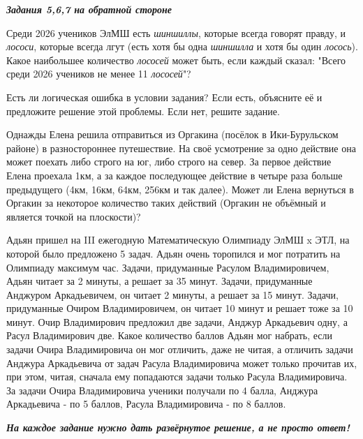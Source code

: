 \centerline{\textbf{\textit{Задания 5,6,7 на обратной стороне}}}

\newpage
\hspace{3mm}

 Среди 2026 учеников ЭлМШ есть \textit{шиншиллы}, которые всегда говорят правду, и \textit{лососи}, которые всегда лгут (есть хотя бы одна \textit{шиншилла} и хотя бы один \textit{лосось}). Какое наибольшее количество \textit{лососей} может быть, если каждый сказал: "Всего среди 2026 учеников не менее 11 \textit{лососей}"?

Есть ли логическая ошибка в условии задания? Если есть, объясните её и предложите решение этой проблемы. Если нет, решите задание.

\hspace{3mm}

 Однажды Елена решила отправиться из Оргакина (посёлок в Ики-Бурульском районе) в разностороннее путешествие. На своё усмотрение за одно действие она может поехать либо строго на юг, либо строго на север. За первое действие Елена проехала 1км, а за каждое последующее действие в четыре раза больше предыдущего (4км, 16км, 64км, 256км и так далее). Может ли Елена вернуться в Оргакин за некоторое количество таких действий (Оргакин не объёмный и является точкой на плоскости)?

\hspace{3mm}

 Адьян пришел на III ежегодную Математическую Олимпиаду ЭлМШ x ЭТЛ, на которой было предложено 5 задач. Адьян очень торопился и мог потратить на Олимпиаду максимум час. Задачи, придуманные Расулом Владимировичем, Адьян читает за 2 минуты, а решает за 35 минут. Задачи, придуманные Анджуром Аркадьевичем, он читает 2 минуты, а решает за 15 минут. Задачи, придуманные Очиром Владимировичем, он читает 10 минут и решает тоже за 10 минут. Очир Владимирович предложил две задачи, Анджур Аркадьевич одну, а Расул Владимирович две. Какое количество баллов Адьян мог набрать, если задачи Очира Владимировича он мог отличить, даже не читая, а отличить задачи Анджура Аркадьевича от задач Расула Владимировича может только прочитав их, при этом, читая, сначала ему попадаются задачи только Расула Владимировича. За задачи Очира Владимировича ученики получали по 4 балла, Анджура Аркадьевича - по 5 баллов, Расула Владимировича - по 8 баллов.

\hspace{3mm}

\centerline{\textbf{\textit{На каждое задание нужно дать развёрнутое решение, а не просто ответ!}}}